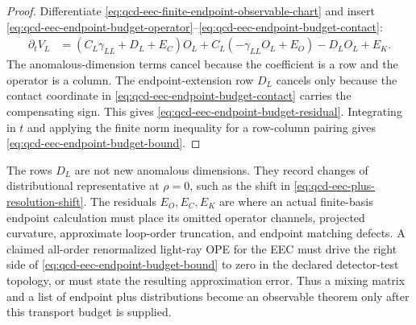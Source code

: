 \begin{proof}
Differentiate \eqref{eq:qcd-eec-finite-endpoint-observable-chart} and insert
\eqref{eq:qcd-eec-endpoint-budget-operator}--\eqref{eq:qcd-eec-endpoint-budget-contact}:
\[
\begin{aligned}
  \partial_tV_L
  &=
  (C_L\gamma_{LL}+D_L+E_C)O_L
  +
  C_L(-\gamma_{LL}O_L+E_O)
  -
  D_LO_L
  +
  E_K .
\end{aligned}
\]
The anomalous-dimension terms cancel because the coefficient is a row and the
operator is a column.  The endpoint-extension row \(D_L\) cancels only because
the contact coordinate in
\eqref{eq:qcd-eec-endpoint-budget-contact} carries the compensating sign.
This gives \eqref{eq:qcd-eec-endpoint-budget-residual}.  Integrating in \(t\)
and applying the finite norm inequality for a row-column pairing gives
\eqref{eq:qcd-eec-endpoint-budget-bound}.
\end{proof}

The rows \(D_L\) are not new anomalous dimensions.  They record changes of
distributional representative at \(\rho=0\), such as the shift in
\eqref{eq:qcd-eec-plus-resolution-shift}.  The residuals \(E_O,E_C,E_K\)
are where an actual finite-basis endpoint calculation must place its omitted
operator channels, projected curvature, approximate loop-order truncation,
and endpoint matching defects.  A claimed all-order renormalized light-ray
OPE for the EEC must drive the right side of
\eqref{eq:qcd-eec-endpoint-budget-bound} to zero in the declared detector-test
topology, or must state the resulting approximation error.  Thus a mixing
matrix and a list of endpoint plus distributions become an observable theorem
only after this transport budget is supplied.


